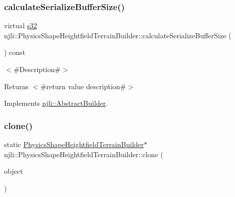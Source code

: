 \mbox{\label{classnjli_1_1_physics_shape_heightfield_terrain_builder_a8e2a29e4482f49f15071c30ec28ed790}} 
\subsubsection{\texorpdfstring{calculate\+Serialize\+Buffer\+Size()}{calculateSerializeBufferSize()}}
{\footnotesize\ttfamily virtual \mbox{\hyperlink{_util_8h_aa62c75d314a0d1f37f79c4b73b2292e2}{s32}} njli\+::\+Physics\+Shape\+Heightfield\+Terrain\+Builder\+::calculate\+Serialize\+Buffer\+Size (\begin{DoxyParamCaption}{ }\end{DoxyParamCaption}) const\hspace{0.3cm}{\ttfamily [virtual]}}

$<$\#\+Description\#$>$

\begin{DoxyReturn}{Returns}
$<$\#return value description\#$>$ 
\end{DoxyReturn}


Implements \mbox{\hyperlink{classnjli_1_1_abstract_builder_aa1d220053e182c37b31b427499c6eacf}{njli\+::\+Abstract\+Builder}}.

\mbox{\label{classnjli_1_1_physics_shape_heightfield_terrain_builder_a6d732c7196301cd10262b5f3e9152057}} 
\subsubsection{\texorpdfstring{clone()}{clone()}}
{\footnotesize\ttfamily static \mbox{\hyperlink{classnjli_1_1_physics_shape_heightfield_terrain_builder}{Physics\+Shape\+Heightfield\+Terrain\+Builder}}$\ast$ njli\+::\+Physics\+Shape\+Heightfield\+Terrain\+Builder\+::clone (\begin{DoxyParamCaption}\item[{const \mbox{\hyperlink{classnjli_1_1_physics_shape_heightfield_terrain_builder}{Physics\+Shape\+Heightfield\+Terrain\+Builder}} \&}]{object }\end{DoxyParamCaption})\hspace{0.3cm}{\ttfamily [static]}}

